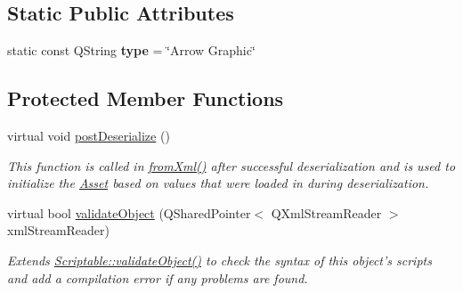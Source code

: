 \subsection*{Static Public Attributes}
\begin{DoxyCompactItemize}
\item 
\hypertarget{class_picto_1_1_arrow_graphic_ac776e19a67a093a0c626c11ae6f209bf}{static const Q\-String {\bfseries type} = \char`\"{}Arrow Graphic\char`\"{}}\label{class_picto_1_1_arrow_graphic_ac776e19a67a093a0c626c11ae6f209bf}

\end{DoxyCompactItemize}
\subsection*{Protected Member Functions}
\begin{DoxyCompactItemize}
\item 
virtual void \hyperlink{class_picto_1_1_arrow_graphic_a385938660fb35e494308717593b12631}{post\-Deserialize} ()
\begin{DoxyCompactList}\small\item\em This function is called in \hyperlink{class_picto_1_1_asset_a8bed4da09ecb1c07ce0dab313a9aba67}{from\-Xml()} after successful deserialization and is used to initialize the \hyperlink{class_picto_1_1_asset}{Asset} based on values that were loaded in during deserialization. \end{DoxyCompactList}\item 
\hypertarget{class_picto_1_1_arrow_graphic_a42ea12aff4743356a2763cd8b4daf797}{virtual bool \hyperlink{class_picto_1_1_arrow_graphic_a42ea12aff4743356a2763cd8b4daf797}{validate\-Object} (Q\-Shared\-Pointer$<$ Q\-Xml\-Stream\-Reader $>$ xml\-Stream\-Reader)}\label{class_picto_1_1_arrow_graphic_a42ea12aff4743356a2763cd8b4daf797}

\begin{DoxyCompactList}\small\item\em Extends \hyperlink{class_picto_1_1_scriptable_ab6e2944c43a3b5d418bf7b251594386d}{Scriptable\-::validate\-Object()} to check the syntax of this object's scripts and add a compilation error if any problems are found. \end{DoxyCompactList}\end{DoxyCompactItemize}

